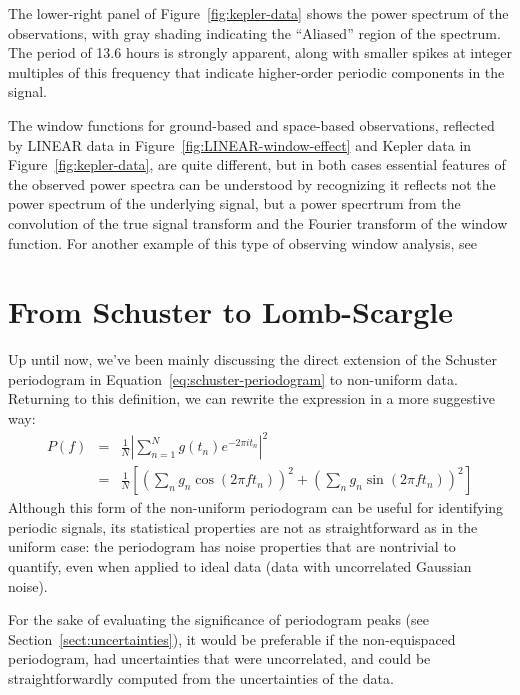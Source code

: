 \documentclass[preprint]{aastex}
\newcommand{\fig}[1]{Figure~\ref{fig:#1}}
\newcommand{\Eq}[1]{Equation~\ref{eq:#1}}
\newcommand{\eq}[1]{\Eq{#1}}
\newcommand{\eqlabel}[1]{\label{eq:#1}}
\newcommand{\Sect}[1]{Section~\ref{sect:#1}}
\newcommand{\sect}[1]{\Sect{#1}}
\newcommand{\sectlabel}[1]{\label{sect:#1}}
\begin{document}
The lower-right panel of \fig{kepler-data} shows the power spectrum of the
observations, with gray shading indicating the ``Aliased'' region of the
spectrum.
The period of 13.6 hours is strongly apparent, along with smaller spikes at
integer multiples of this frequency that indicate higher-order periodic
components in the signal.

The window functions for ground-based and space-based observations, reflected
by LINEAR data in \fig{LINEAR-window-effect} and Kepler data in
\fig{kepler-data}, are quite different, but in both cases essential features
of the observed power spectra can be understood by recognizing it reflects
not the power spectrum of the underlying signal, but a power specrtrum from
the convolution of the true signal transform and the Fourier transform of
the window function.
For another example of this type of observing window analysis, see
\citep{Deeming75}


\section{From Schuster to Lomb-Scargle}
\sectlabel{schuster-to-lomb-scargle}

Up until now, we've been mainly discussing the direct extension of the Schuster
periodogram in \eq{schuster-periodogram} to non-uniform data.
Returning to this definition, we can rewrite the expression in a more
suggestive way:
\begin{eqnarray}
  P(f)
  &=& \frac{1}{N}\left|\sum_{n=1}^N g(t_n)e^{-2\pi i t_n} \right|^2 \nonumber\\
  &=& \frac{1}{N}\left[
    \left(\sum_n g_n \cos(2\pi f t_n)\right)^2
    + \left(\sum_n g_n \sin(2\pi f t_n)\right)^2
    \right]
  \eqlabel{classical-periodogram}
\end{eqnarray}
Although this form of the non-uniform periodogram can be useful for identifying
periodic signals, its statistical properties are not as straightforward as in
the uniform case: the periodogram has noise properties that are nontrivial
to quantify, even when applied to ideal data (data with uncorrelated
Gaussian noise).

For the sake of evaluating the significance of periodogram peaks
(see \sect{uncertainties}), it would be preferable if the non-equispaced
periodogram, had uncertainties that were uncorrelated, and could be
straightforwardly computed from the uncertainties of the data.
\end{document}
